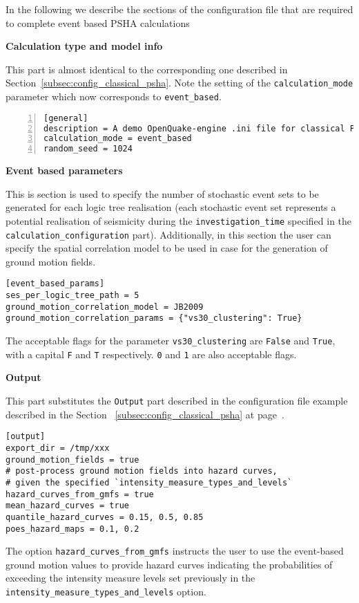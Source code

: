 In the following we describe the sections of the configuration file that are
required to complete event based PSHA calculations


\textbf{Calculation type and model info}

This part is almost identical to the corresponding one described in
Section~\ref{subsec:config_classical_psha}. Note the setting of the
\texttt{calculation\_mode} parameter which now corresponds to
\texttt{event\_based}.

\begin{Verbatim}[frame=single, commandchars=\\\{\}, fontsize=\small,
    numbers=left, numbersep=2pt]
[general]
description = A demo OpenQuake-engine .ini file for classical PSHA
calculation_mode = event_based
random_seed = 1024
\end{Verbatim}



\textbf{Event based parameters}

This is section is used to specify the number of stochastic event sets to be
generated for each logic tree realisation  (each stochastic event set
represents a potential realisation of seismicity during the
\texttt{investigation\_time} specified in the
\texttt{calculation\_configuration} part). Additionally, in this section the
user can specify the spatial correlation model to be used in case for the
generation of ground motion fields.

\begin{Verbatim}[frame=single, commandchars=\\\{\}, fontsize=\small]
[event_based_params]
ses_per_logic_tree_path = 5
ground_motion_correlation_model = JB2009
ground_motion_correlation_params = {"vs30_clustering": True}
\end{Verbatim}

The acceptable flags for the parameter \verb+vs30_clustering+ are \verb+False+
and \verb+True+, with a capital \verb+F+ and \verb+T+ respectively. \verb+0+
and \verb+1+ are also acceptable flags.



\textbf{Output}

This part substitutes the \texttt{Output} part described in  the configuration
file example described in the Section~ \ref{subsec:config_classical_psha} at
page~\pageref{subsec:config_classical_psha}.

\begin{Verbatim}[frame=single, commandchars=\\\{\}, fontsize=\small]
[output]
export_dir = /tmp/xxx
ground_motion_fields = true
# post-process ground motion fields into hazard curves,
# given the specified `intensity_measure_types_and_levels`
hazard_curves_from_gmfs = true
mean_hazard_curves = true
quantile_hazard_curves = 0.15, 0.5, 0.85
poes_hazard_maps = 0.1, 0.2
\end{Verbatim}

The option \verb=hazard_curves_from_gmfs= instructs the user to use the event-based ground motion values to provide hazard curves indicating the probabilities of exceeding the intensity measure levels set previously in the \verb=intensity_measure_types_and_levels= option.